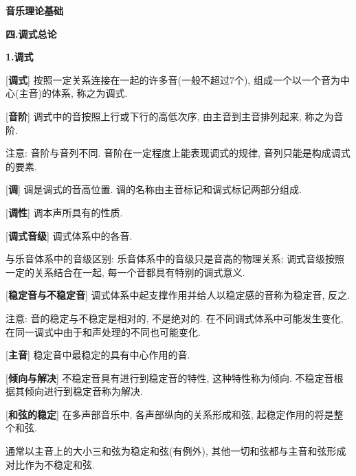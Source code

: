 

\begin{center} 
 \Large \textbf{音乐理论基础}\par
 \textbf{四.调式总论}
\end{center}

\large 
\begin{center}
 \textbf{1.调式}\\
\end{center}

[\textbf{调式}] 按照一定关系连接在一起的许多音(一般不超过7个), 组成一个以一个音为中心(主音)的体系, 称之为调式.\par

[\textbf{音阶}] 调式中的音按照上行或下行的高低次序, 由主音到主音排列起来, 称之为音阶.\par
\qquad 注意: 音阶与音列不同. 音阶在一定程度上能表现调式的规律, 音列只能是构成调式的要素.\par

[\textbf{调}] 调是调式的音高位置. 调的名称由主音标记和调式标记两部分组成.\par

[\textbf{调性}] 调本声所具有的性质.\par

[\textbf{调式音级}] 调式体系中的各音.\par
\qquad 与乐音体系中的音级区别: 乐音体系中的音级只是音高的物理关系; 调式音级按照一定的关系结合在一起, 每一个音都具有特别的调式意义.\par

[\textbf{稳定音与不稳定音}] 调式体系中起支撑作用并给人以稳定感的音称为稳定音, 反之.\par
\qquad 注意: 音的稳定与不稳定是相对的, 不是绝对的. 在不同调式体系中可能发生变化, 在同一调式中由于和声处理的不同也可能变化.\par

[\textbf{主音}] 稳定音中最稳定的具有中心作用的音.\par

[\textbf{倾向与解决}] 不稳定音具有进行到稳定音的特性, 这种特性称为倾向. 不稳定音根据其倾向进行到稳定音称为解决.\par

[\textbf{和弦的稳定}] 在多声部音乐中, 各声部纵向的关系形成和弦, 起稳定作用的将是整个和弦.\par
\qquad 通常以主音上的大小三和弦为稳定和弦(有例外), 其他一切和弦都与主音和弦形成对比作为不稳定和弦.\par


